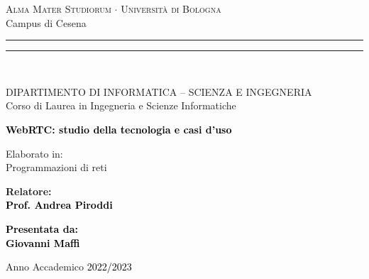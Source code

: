\documentclass[11pt, a4paper, openany]{book}
\begin{document}
		
	\begin{titlepage}
		\begin{center}
			{{\Large{\textsc{Alma Mater Studiorum $\cdot$ Universit\`a di Bologna}}} \\ \large Campus di Cesena} 
			\rule[0.1cm]{15.8cm}{0.1mm}
			\rule[0.5cm]{15.8cm}{0.6mm}
			\\\vspace{3mm}
			
			{\small{ DIPARTIMENTO DI INFORMATICA – SCIENZA E INGEGNERIA \\ 
					Corso di Laurea in Ingegneria e Scienze Informatiche}}
			
		\end{center}
		
		\vspace{23mm}
		
		\begin{center}\textcolor{black}{
				{\LARGE{\bf WebRTC: studio della tecnologia e casi d'uso}}\\
		}\end{center}
		
		\vspace{25mm}
		
		\begin{center}
			{\Large Elaborato in:\\
			Programmazioni di reti}
		\end{center}
		
		\vspace{25mm} \par \noindent
		
		\begin{minipage}[t]{0.47\textwidth}
			{\large{\bf Relatore: \vspace{2mm}\\\textcolor{black}{
						Prof. Andrea Piroddi}}}
		\end{minipage}
		\hfill
		\begin{minipage}[t]{0.47\textwidth}\raggedleft \textcolor{black}{
				{\large{\bf Presentata da:\vspace{2mm}\\Giovanni Maffi}}}
		\end{minipage}
		
		\vspace{40mm}
		
		\begin{center}
			Anno Accademico \textcolor{black}{2022/2023}
		\end{center}
		
	\end{titlepage}
	
\end{document}

